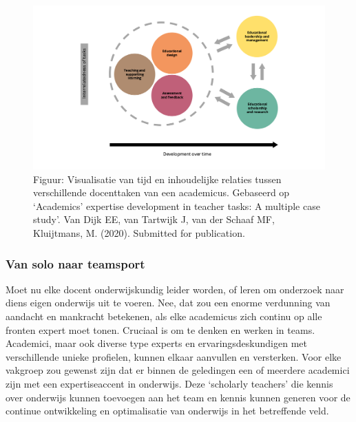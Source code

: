 \documentclass[empirical, authordate, ]{new-jote-article}
\begin{document}
	\begin{figure}
		\includegraphics[width=\linewidth]{media/image7.png}



		\label{fig:rId23}



		\caption{Figuur: Visualisatie van tijd en inhoudelijke relaties tussen verschillende docenttaken van een academicus. Gebaseerd op ‘Academics' expertise development in teacher tasks: A multiple case study'. Van Dijk EE, van Tartwijk J, van der Schaaf MF, Kluijtmans, M. (2020). Submitted for publication.}
	\end{figure}



	\subsubsection{Van solo naar teamsport}



	Moet nu elke docent onderwijskundig leider worden, of leren om onderzoek naar diens eigen onderwijs uit te voeren. Nee, dat zou een enorme verdunning van aandacht en mankracht betekenen, als elke academicus zich continu op alle fronten expert moet tonen. Cruciaal is om te denken en werken in teams. Academici, maar ook diverse type experts en ervaringsdeskundigen met verschillende unieke profielen, kunnen elkaar aanvullen en versterken. Voor elke vakgroep zou gewenst zijn dat er binnen de geledingen een of meerdere academici zijn met een expertiseaccent in onderwijs. Deze ‘scholarly teachers' die kennis over onderwijs kunnen toevoegen aan het team en kennis kunnen generen voor de continue ontwikkeling en optimalisatie van onderwijs in het betreffende veld.
\end{document}
